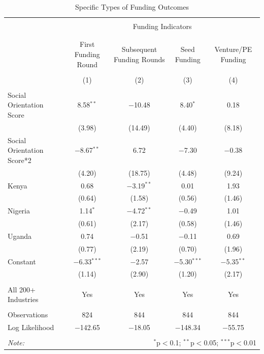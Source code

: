\documentclass[12pt]{article}
\begin{document}
\begin{table}[!htbp] \centering 
  \caption{Specific Types of Funding Outcomes} 
  \label{} 
\scriptsize 
\begin{tabular}{@{\extracolsep{5pt}}lcccc} 
\\[-1.8ex]\hline 
\hline \\[-1.8ex] 
 & \multicolumn{4}{c}{Funding Indicators} \\ 
\cline{2-5} 
\\[-1.8ex] &  &  &  &  \\ 
 & First Funding Round & Subsequent Funding Rounds & Seed Funding & Venture/PE Funding \\ 
\\[-1.8ex] & (1) & (2) & (3) & (4)\\ 
\hline \\[-1.8ex] 
 Social Orientation Score & 8.58$^{**}$ & $-$10.48 & 8.40$^{*}$ & 0.18 \\ 
  & (3.98) & (14.49) & (4.40) & (8.18) \\ 
  Social Orientation Score*2 & $-$8.67$^{**}$ & 6.72 & $-$7.30 & $-$0.38 \\ 
  & (4.20) & (18.75) & (4.48) & (9.24) \\ 
  Kenya & 0.68 & $-$3.19$^{**}$ & 0.01 & 1.93 \\ 
  & (0.64) & (1.58) & (0.56) & (1.46) \\ 
  Nigeria & 1.14$^{*}$ & $-$4.72$^{**}$ & $-$0.49 & 1.01 \\ 
  & (0.61) & (2.17) & (0.58) & (1.46) \\ 
  Uganda & 0.74 & $-$0.51 & $-$0.11 & 0.69 \\ 
  & (0.77) & (2.19) & (0.70) & (1.96) \\ 
  Constant & $-$6.33$^{***}$ & $-$2.57 & $-$5.30$^{***}$ & $-$5.35$^{**}$ \\ 
  & (1.14) & (2.90) & (1.20) & (2.17) \\ 
 \hline \\[-1.8ex] 
 All 200+ Industries & Yes & Yes & Yes & Yes \\ 
  \hline \\[-1.8ex] 
Observations & 824 & 844 & 844 & 844 \\ 
Log Likelihood & $-$142.65 & $-$18.05 & $-$148.34 & $-$55.75 \\ 
\hline 
\hline \\[-1.8ex] 
\textit{Note:}  & \multicolumn{4}{r}{$^{*}$p$<$0.1; $^{**}$p$<$0.05; $^{***}$p$<$0.01} \\ 
\end{tabular} 
\end{table} 
\FloatBarrier
\end{document}
